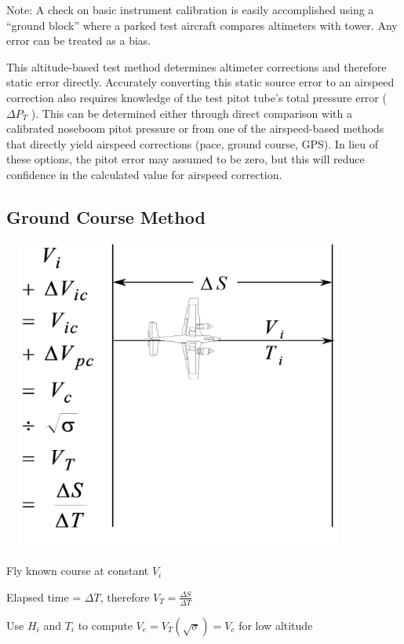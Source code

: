 \documentclass[
]{book}
\begin{document}
Note: A check on basic instrument calibration is easily accomplished using a ``ground block'' where a parked test aircraft compares altimeters with tower. Any error can be treated as a bias.

This altitude-based test method determines altimeter corrections and therefore static error directly. Accurately converting this static source error to an airspeed correction also requires knowledge of the test pitot tube's total pressure error (\(\Delta P_T\) ). This can be determined either through direct comparison with a calibrated noseboom pitot pressure or from one of the airspeed-based methods that directly yield airspeed corrections (pace, ground course, GPS). In lieu of these options, the pitot error may assumed to be zero, but this will reduce confidence in the calculated value for airspeed correction.

\hypertarget{ground-course-method}{%
\subsection{Ground Course Method}\label{ground-course-method}}

\includegraphics[width=4.5625in,height=4.0625in]{media/04/image19.svg}

Fly known course at constant \(V_i\)

Elapsed time = \(\Delta T\), therefore \(V_T = \frac{\Delta S}{\Delta T}\)

Use \(H_i\) and \(T_i\) to compute \(V_e = V_T \left(\sqrt{\sigma} \right) = V_c\) for low altitude
\end{document}

